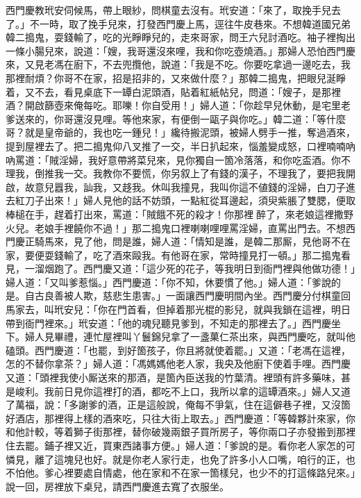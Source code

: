 西門慶教玳安伺候馬，帶上眼紗，問棋童去沒有。玳安道：「來了，取挽手兒去了。」不一時，取了挽手兒來，打發西門慶上馬，逕往牛皮巷來。不想韓道國兄弟韓二搗鬼，耍錢輸了，吃的光睜睜兒的，走來哥家，問王六兒討酒吃。袖子裡掏出一條小腸兒來，說道：「嫂，我哥還沒來哩，我和你吃壺燒酒。」那婦人恐怕西門慶來，又見老馮在廚下，不去兜攬他，說道：「我是不吃。你要吃拿過一邊吃去，我那裡耐煩？你哥不在家，招是招非的，又來做什麼？」那韓二搗鬼，把眼兒涎睜着，又不去，看見桌底下一罈白泥頭酒，貼着紅紙帖兒，問道：「嫂子，是那裡酒？開啟篩壺來俺每吃。耶嚛！你自受用！」婦人道：「你趁早兒休動，是宅里老爹送來的，你哥還沒見哩。等他來家，有便倒一甌子與你吃。」韓二道：「等什麼哥？就是皇帝爺的，我也吃一鍾兒！」纔待搬泥頭，被婦人劈手一推，奪過酒來，提到屋裡去了。把二搗鬼仰八叉推了一交，半日扒起來，惱羞變成怒，口裡喃喃吶吶罵道：「賊淫婦，我好意帶將菜兒來，見你獨自一箇冷落落，和你吃盃酒。你不理我，倒推我一交。我教你不要慌，你另叙上了有錢的漢子，不理我了，要把我開啟，故意兒囂我，訕我，又趍我。休叫我撞見，我叫你這不値錢的淫婦，白刀子進去紅刀子出來！」婦人見他的話不妨頭，一點紅從耳邊起，須臾紫脹了雙腮，便取棒槌在手，趕着打出來，{}罵道：「賊餓不死的殺才！你那裡𠳹醉了，來老娘這裡撒野火兒。老娘手裡饒你不過！」那二搗鬼口裡喇喇哩哩罵淫婦，直罵出門去。不想西門慶正騎馬來，見了他，問是誰，婦人道：「情知是誰，是韓二那厮，見他哥不在家，要便耍錢輸了，吃了酒來毆我。有他哥在家，常時撞見打一頓。」那二搗鬼看見，一溜烟跑了。西門慶又道：「這少死的花子，等我明日到衙門裡與他做功德！」婦人道：「又叫爹惹惱。」西門慶道：「你不知，休要慣了他。」婦人道：「爹說的是。自古良善被人欺，慈悲生患害。」一面讓西門慶明間內坐。西門慶分付棋童回馬家去，叫玳安兒：「你在門首看，但掉着那光棍的影兒，就與我鎖在這裡，明日帶到衙門裡來。」玳安道：「他的魂兒聽見爹到，不知走的那裡去了。」西門慶坐下。婦人見畢禮，連忙屋裡叫丫鬟錦兒拿了一盞菓仁茶出來，與西門慶吃，就叫他磕頭。西門慶道：「也罷，到好箇孩子，你且將就使着罷。」又道：「老馮在這裡，怎的不替你拿茶？」婦人道：「馮媽媽他老人家，我央及他廚下使着手哩。西門慶又道：「頭裡我使小厮送來的那酒，是箇內臣送我的竹葉清。裡頭有許多藥味，甚是峻利。我前日見你這裡打的酒，都吃不上口，我所以拿的這罈酒來。」婦人又道了萬福，說：「多謝爹的酒，正是這般說，俺每不爭氣，住在這僻巷子裡，又沒箇好酒店，那裡得上樣的酒來吃，只往大街上取去。」西門慶道：「等韓夥計來家，你和他計較，等着獅子街那裡，替你破幾兩銀子買所房子，等你兩口子亦發搬到那裡住去罷。鋪子裡又近，買東西諸事方便。」婦人道：「爹說的是。看你老人家怎的可憐見，離了這塊兒也好。就是你老人家行走，也免了許多小人口嘴，咱行的正，也不怕他。{}爹心裡要處自情處，他在家和不在家一箇樣兒，也少不的打這條路兒來。」{}說一回，房裡放下桌兒，請西門慶進去寬了衣服坐。

